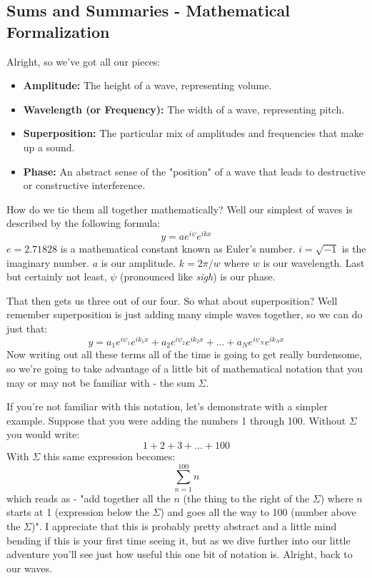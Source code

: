 \documentclass[10pt,a4paper]{article}
\begin{document}
\subsection{Sums and Summaries - Mathematical Formalization}
Alright, so we've got all our pieces:
\begin{itemize}
\item \textbf{Amplitude:} The height of a wave, representing volume.
\item \textbf{Wavelength (or Frequency):} The width of a wave, representing pitch.
\item \textbf{Superposition:} The particular mix of amplitudes and frequencies that make up a sound.
\item \textbf{Phase:} An abstract sense of the "position" of a wave that leads to destructive or constructive interference.
\end{itemize}

How do we tie them all together mathematically? Well our simplest of waves is described by the following formula:
\begin{equation}
y=a e^{i\psi}e^{ikx}
\end{equation}
$e=2.71828$ is a mathematical constant known as Euler's number. $i=\sqrt{-1}$ is the imaginary number. $a$ is our amplitude. $k=2\pi/w$ where $w$ is our wavelength. Last but certainly not least, $\psi$ (pronounced like \textit{sigh}) is our phase. 

That then gets us three out of our four. So what about superposition? Well remember superposition is just adding many simple waves together, so we can do just that: 
\begin{equation}
y = a_1 e^{i\psi_1}e^{ik_1x} + a_2 e^{i\psi_2}e^{ik_2x} + ... + a_N e^{i\psi_N}e^{ik_Nx}
\end{equation}
Now writing out all these terms all of the time is going to get really burdensome, so we're going to take advantage of a little bit of mathematical notation that you may or may not be familiar with - the sum $\Sigma$. 

If you're not familiar with this notation, let's demonstrate with a simpler example. Suppose that you were adding the numbers 1 through 100. Without $\Sigma$ you would write:
\begin{equation}
1 + 2 + 3 + ... + 100
\end{equation}
With $\Sigma$ this same expression becomes:
\begin{equation}
\sum_{n=1}^{100}n
\end{equation}
which reads as - "add together all the $n$ (the thing to the right of the $\Sigma$) where $n$ starts at 1 (expression below the $\Sigma$) and goes all the way to 100 (number above the $\Sigma$)". I appreciate that this is probably pretty abstract and a little mind bending if this is your first time seeing it, but as we dive further into our little adventure you'll see just how useful this one bit of notation is. Alright, back to our waves.
\end{document}

